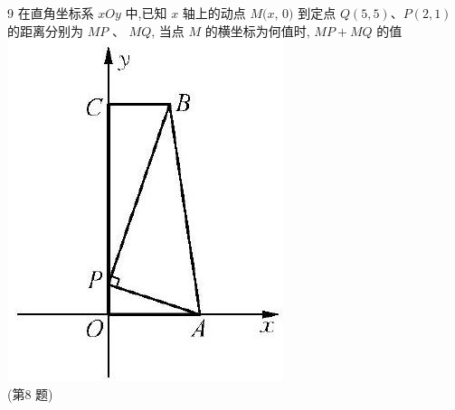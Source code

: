\documentclass[10pt]{article}
\begin{document}
9 在直角坐标系 $x O y$ 中,已知 $x$ 轴上的动点 $M(x$, $0)$ 到定点 $Q(5,5) 、 P(2,1)$ 的距离分别为 $M P$ 、 $M Q$, 当点 $M$ 的横坐标为何值时, $M P+M Q$ 的值\\
\includegraphics[max width=\textwidth, center]{2024_10_30_1bf34f7aeb61f11d11d3g-023}\\
(第8 题)
\end{document}
